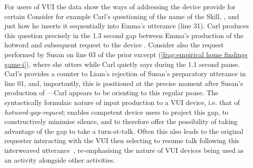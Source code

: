 For users of \ac{VUI} the data show the ways of addressing the device provide for certain 
Consider for example Carl's questioning of the name of the Skill, , and just how he inserts it sequentially into Emma's utterance (line 31).
Carl produces this question precisely in the 1.3 second gap between Emma's production of the hotword  and subsequent request to the device .
Consider also the request performed by Susan on line 03 of the prior excerpt (\autoref{frag:empirical home findings game-i}), where she utters  while Carl quietly says  during the 1.1 second pause.
Carl's  provides a counter to Liam's rejection of Susan's preparatory utterance in line 01, and, importantly, this  is positioned at the precise moment after Susan's production of ---Carl appears to be orienting to this regular pause.
The syntactically formulaic nature of input production to a \ac{VUI} device, i.e. that of \textit{hotword-gap-request}; enables competent device users to project this gap, to constructively minimise silence, and to therefore offer the possibility of taking advantage of the gap to take a turn-at-talk.
Often this also leads to the original requester interacting with the \ac{VUI} then selecting to resume talk following this interweaved utterance~\citep[302--304]{DeVault2014}, re-emphasising the nature of \ac{VUI} devices being used as an activity alongside other activities.






